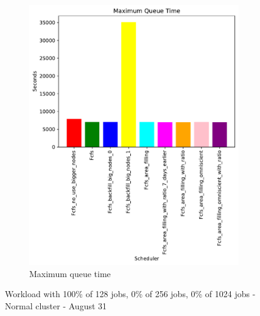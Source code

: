 \documentclass[a4paper]{article}
\begin{document}
\begin{figure}[H]
\begin{subfigure}[b]{0.4\linewidth}\centering\includegraphics[width=0.95\linewidth]{MBSS/plot/Size_Constraint_2022-01-17->2022-01-17_V10000_Maximum_queue_time_450_128_32_256_4_1024.pdf}\caption{Maximum queue time}\label{45}\end{subfigure}
\caption{Workload with 100\% of 128 jobs, 0\% of 256 jobs, 0\% of 1024 jobs - Normal cluster - August 31}\label{49}\end{figure}
\end{document}
